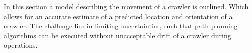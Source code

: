 In this section a model describing the movement of a crawler is outlined. Which allows for an accurate estimate of a
predicted location and orientation of a crawler. The challenge lies in limiting uncertainties, such that path
planning algorithms can be executed without unacceptable drift of a crawler during operations.
%
